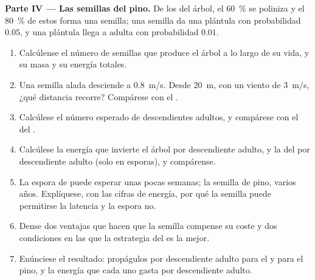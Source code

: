 \begin{problem}
\medskip
\noindent\textbf{Parte IV --- Las semillas del pino.}
De los  del árbol, el \qty{60}{\%} se poliniza y el \qty{80}{\%} de
estos forma una semilla; una semilla da una plántula con probabilidad
$0.05$, y una plántula llega a adulta con probabilidad $0.01$.
\begin{enumerate}[resume]
  \item Calcúlense el número de semillas que produce el árbol a lo largo
        de su vida, y su masa y su energía totales.
  \item Una semilla alada desciende a \qty{0.8}{m/s}. Desde \qty{20}{m},
        con un viento de \qty{3}{m/s}, ¿qué distancia recorre? Compárese
        con el .
  \item Calcúlese el número esperado de descendientes adultos, y
        compárese con el del .
  \item Calcúlese la energía que invierte el árbol por descendiente
        adulto, y la del  por descendiente adulto (solo en
        esporas), y compárense.
  \item La espora de  puede esperar unas pocas semanas; la semilla
        de pino, varios años. Explíquese, con las cifras de energía, por
        qué la semilla puede permitirse la latencia y la espora no.
  \item Dense dos ventajas que hacen que la semilla compense su coste y
        dos condiciones en las que la estrategia del  es la mejor.
  \item Enúnciese el resultado: propágulos por descendiente adulto para
        el  y para el pino, y la energía que cada uno gasta por
        descendiente adulto.
\end{enumerate}
\end{problem}
